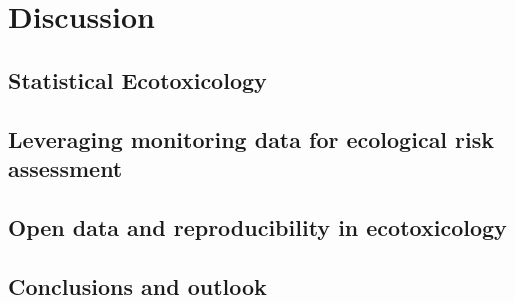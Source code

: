 \chapter{Discussion}
\label{sec:discussion} 
 
\section{Statistical Ecotoxicology}



\section{Leveraging monitoring data for ecological risk assessment}



\section{Open data and reproducibility in ecotoxicology}

\section{Conclusions and outlook}


